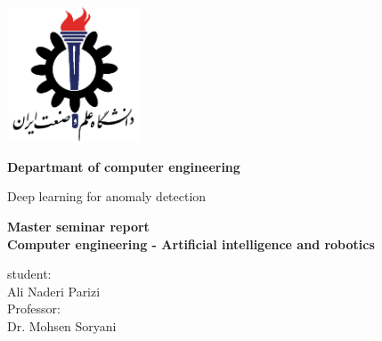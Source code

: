 \documentclass[12pt,a4paper]{article}
\theoremstyle{definition}
\theoremstyle{theorem}
\theoremstyle{definition}
\begin{document}
\begin{latin}
\thispagestyle{empty}

	\vspace*{25mm}
	\centerline{\includegraphics[height=4cm]{./images/logos/iust.png}}

	\begin{center}
	\textbf{
Departmant of computer engineering
	}
	\\[1cm]
	\baselineskip=2cm
	{\titr
	\begin{Huge}
	Deep learning for anomaly detection\\[1cm]
	\end{Huge}}
	{\Large 
		\textbf{
			Master seminar report \\
Computer engineering - Artificial intelligence and robotics
		} \\[1cm]
	}

	{\Large  
	student:
	\\[.5cm]
	{\Large  Ali Naderi Parizi }
	\\
	{\Large  
		Professor:
	}}
	\\
	{\Large  Dr. Mohsen Soryani}
	\\[.6cm]
\date{\today}
	\end{center}

\end{latin}
\end{document}
